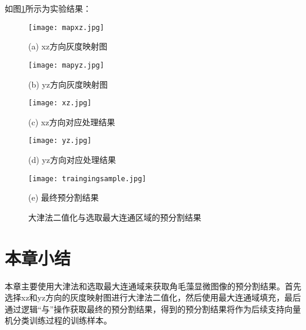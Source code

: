 如图\ref{trainingsampleresult}所示为实验结果：
\begin{figure}
\centering
    \begin{minipage}[b]{0.45\linewidth}
    \centering
    \texttt{[image: mapxz.jpg]}
      \centerline{(a) xz方向灰度映射图}\medskip
  \end{minipage}
  \begin{minipage}[b]{0.45\linewidth}
    \centering
    \texttt{[image: mapyz.jpg]}
      \centerline{(b) yz方向灰度映射图}\medskip
  \end{minipage}
   \begin{minipage}[b]{0.45\linewidth}
    \centering
    \texttt{[image: xz.jpg]}
      \centerline{(c) xz方向对应处理结果}\medskip
  \end{minipage}
  \begin{minipage}[b]{0.45\linewidth}
    \centering
    \texttt{[image: yz.jpg]}
      \centerline{(d) yz方向对应处理结果}\medskip
  \end{minipage}
   \begin{minipage}[b]{0.45\linewidth}
    \centering
    \texttt{[image: traingingsample.jpg]}
      \centerline{(e) 最终预分割结果}\medskip
  \end{minipage}
 \caption{大津法二值化与选取最大连通区域的预分割结果}
  \label{trainingsampleresult}
\end{figure}

\section{本章小结}
本章主要使用大津法和选取最大连通域来获取角毛藻显微图像的预分割结果。首先选择xz和yz方向的灰度映射图进行大津法二值化，然后使用最大连通域填充，最后通过逻辑“与”操作获取最终的预分割结果，得到的预分割结果将作为后续支持向量机分类训练过程的训练样本。

